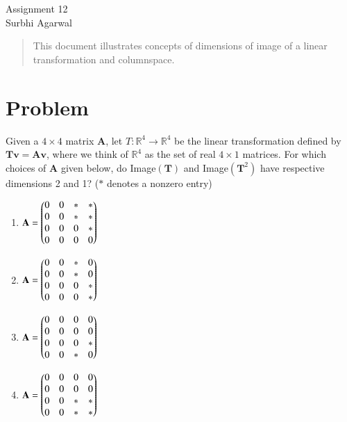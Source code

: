 \documentclass[journal,12pt]{IEEEtran}
\begin{document}
\let\StandardTheFigure\thefigure
\let\vec\mathbf

\renewcommand{\thefigure}{\theproblem}

\def\putbox#1#2#3{\makebox[0in][l]{\makebox[#1][l]{}\raisebox{\baselineskip}[0in][0in]{\raisebox{#2}[0in][0in]{#3}}}}
     \def\rightbox#1{\makebox[0in][r]{#1}}
     \def\centbox#1{\makebox[0in]{#1}}
     \def\topbox#1{\raisebox{-\baselineskip}[0in][0in]{#1}}
     \def\midbox#1{\raisebox{-0.5\baselineskip}[0in][0in]{#1}}
\vspace{3cm}
\begin{center}
\huge Assignment 12\\
\large Surbhi Agarwal\\
\end{center}
\renewcommand{\thefigure}{\theenumi}
\renewcommand{\thetable}{\theenumi}

\begin{abstract}
This document illustrates concepts of dimensions of image of a linear transformation and columnspace.
\end{abstract}

\section{Problem}
Given a $4 \times 4$ matrix $\vec{A}$, let $T:\mathbb R^4 \rightarrow \mathbb R^4$ be the linear transformation defined by $\vec{T}\vec{v} = \vec{A}\vec{v}$, where we think of $\mathbb R^4$ as the set of real $4 \times 1$ matrices. For which choices of $\vec{A}$ given below, do Image$(\vec{T})$ and Image$(\vec{T}^2)$ have respective dimensions 2 and 1? ($*$ denotes a nonzero entry)
\begin{enumerate}
    \item $\vec{A} = \myvec{0 & 0 & * & * \\ 0 & 0 & * & * \\ 0 & 0 & 0 & * \\ 0 & 0 & 0 & 0}$
    \item $\vec{A} = \myvec{0 & 0 & * & 0 \\ 0 & 0 & * & 0 \\ 0 & 0 & 0 & * \\ 0 & 0 & 0 & *}$
    \item $\vec{A} = \myvec{0 & 0 & 0 & 0 \\ 0 & 0 & 0 & 0 \\ 0 & 0 & 0 & * \\ 0 & 0 & * & 0}$
    \item $\vec{A} = \myvec{0 & 0 & 0 & 0 \\ 0 & 0 & 0 & 0 \\ 0 & 0 & * & * \\ 0 & 0 & * & *}$
\end{enumerate}
\end{document}
